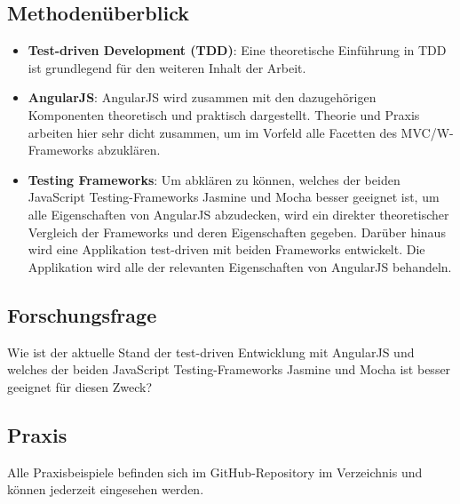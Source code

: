 \subsection{Methodenüberblick}
\begin{itemize}
  \item \textbf{Test-driven Development (TDD)}: Eine theoretische Einführung in TDD ist grundlegend für den weiteren Inhalt der Arbeit.
  \item \textbf{AngularJS}: AngularJS wird zusammen mit den dazugehörigen Komponenten theoretisch und praktisch dargestellt. Theorie und Praxis arbeiten hier sehr dicht zusammen, um im Vorfeld alle Facetten des MVC/W-Frameworks abzuklären.
  \item \textbf{Testing Frameworks}: Um abklären zu können, welches der beiden JavaScript Testing-Frameworks {\glqq Jasmine\grqq} und {\glqq Mocha\grqq} besser geeignet ist, um alle Eigenschaften von AngularJS abzudecken, wird ein direkter theoretischer Vergleich der Frameworks und deren Eigenschaften gegeben. Darüber hinaus wird eine Applikation test-driven mit beiden Frameworks entwickelt. Die Applikation wird alle der relevanten Eigenschaften von AngularJS behandeln.
\end{itemize}

\subsection{Forschungsfrage}
Wie ist der aktuelle Stand der test-driven Entwicklung mit AngularJS und welches der beiden JavaScript Testing-Frameworks {\glqq Jasmine\grqq} und {\glqq Mocha\grqq} ist besser geeignet für diesen Zweck?

\subsection{Praxis}
Alle Praxisbeispiele befinden sich im GitHub-Repository  im Verzeichnis  und können jederzeit eingesehen werden.

